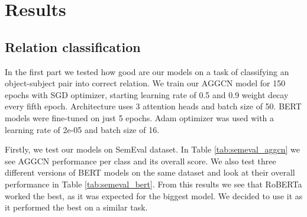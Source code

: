 \documentclass[fleqn,moreauthors,10pt]{ds_report}
\begin{document}


\section{Results}

\subsection{Relation classification}
\par In the first part we tested how good are our models on a task of classifying an object-subject pair into correct relation. We train our AGGCN model for 150 epochs with SGD optimizer, starting learning rate of 0.5 and 0.9 weight decay every fifth epoch. Architecture uses 3 attention heads and batch size of 50. BERT models were fine-tuned on just 5 epochs. Adam optimizer was used with a learning rate of 2e-05 and batch size of 16. 

\par Firstly, we test our models on SemEval dataset. In Table \ref{tab:semeval_aggcn} we see AGGCN performance per class and its overall score. We also test three different versions of BERT models on the same dataset and look at their overall performance in Table \ref{tab:semeval_bert}. From this results we see that RoBERTa worked the best, as it was expected for the biggest model. We decided to use it as it performed the best on a similar task.
\end{document}
